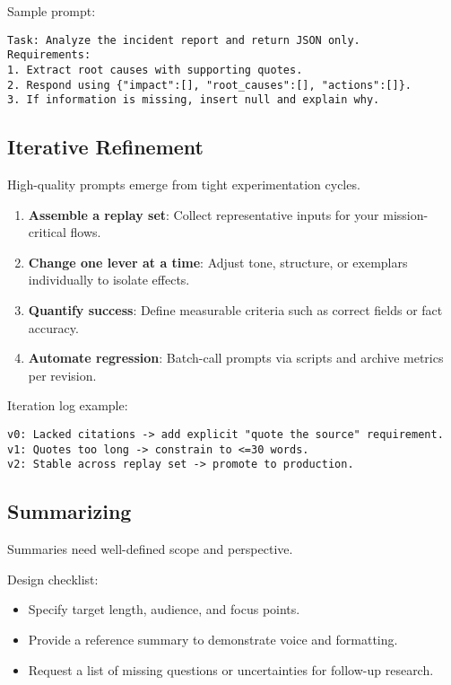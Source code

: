 ﻿\documentclass[12pt]{article}
\begin{document}
Sample prompt:
\begin{verbatim}
Task: Analyze the incident report and return JSON only.
Requirements:
1. Extract root causes with supporting quotes.
2. Respond using {"impact":[], "root_causes":[], "actions":[]}.
3. If information is missing, insert null and explain why.
\end{verbatim}

\subsection{Iterative Refinement}
High-quality prompts emerge from tight experimentation cycles.

\begin{enumerate}[leftmargin=*,itemsep=0.4em]
  \item \textbf{Assemble a replay set}: Collect representative inputs for your mission-critical flows.
  \item \textbf{Change one lever at a time}: Adjust tone, structure, or exemplars individually to isolate effects.
  \item \textbf{Quantify success}: Define measurable criteria such as correct fields or fact accuracy.
  \item \textbf{Automate regression}: Batch-call prompts via scripts and archive metrics per revision.
\end{enumerate}

Iteration log example:
\begin{verbatim}
v0: Lacked citations -> add explicit "quote the source" requirement.
v1: Quotes too long -> constrain to <=30 words.
v2: Stable across replay set -> promote to production.
\end{verbatim}

\subsection{Summarizing}
Summaries need well-defined scope and perspective.

Design checklist:
\begin{itemize}[leftmargin=*,itemsep=0.4em]
  \item Specify target length, audience, and focus points.
  \item Provide a reference summary to demonstrate voice and formatting.
  \item Request a list of missing questions or uncertainties for follow-up research.
\end{itemize}
\end{document}

